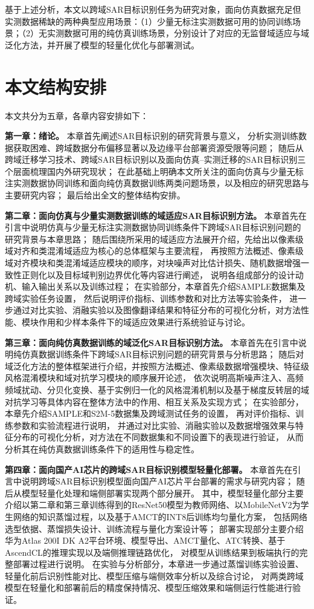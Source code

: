 基于上述分析，本文以跨域SAR目标识别任务为研究对象，面向仿真数据充足但实测数据稀缺的两种典型应用场景：（1）少量无标注实测数据可用的协同训练场景；（2）无实测数据可用的纯仿真训练场景，分别设计了对应的无监督域适应与域泛化方法，并开展了模型的轻量化优化与部署测试。


\section{本文结构安排}

本文共分为五章，各章内容安排如下：

\textbf{第一章：绪论。}
本章首先阐述SAR目标识别的研究背景与意义，
分析实测训练数据获取困难、跨域数据分布偏移显著以及边缘平台部署资源受限等问题；
随后从跨域迁移学习技术、跨域SAR目标识别以及面向仿真--实测迁移的SAR目标识别三个层面梳理国内外研究现状；
在此基础上明确本文所关注的面向仿真与少量无标注实测数据协同训练和面向纯仿真数据训练两类问题场景，以及相应的研究思路与主要研究内容；
最后给出全文的整体结构安排。

\textbf{第二章：面向仿真与少量实测数据训练的域适应SAR目标识别方法。}
本章首先在引言中说明仿真与少量无标注实测数据协同训练条件下跨域SAR目标识别问题的研究背景与本章思路；
随后围绕所采用的域适应方法展开介绍，先给出以像素级域对齐和类混淆域适应为核心的总体框架与主要流程，
再按照方法概述、像素级域对齐模块和类混淆域适应模块的顺序，对块噪声对比估计损失、随机数据增强一致性正则化以及目标域判别边界优化等内容进行阐述，
说明各组成部分的设计动机、输入输出关系以及训练过程；
在实验部分，本章首先介绍SAMPLE数据集及跨域实验任务设置，
然后说明评价指标、训练参数和对比方法等实验条件，
进一步通过对比实验、消融实验以及图像翻译结果和特征分布的可视化分析，对方法性能、模块作用和少样本条件下的域适应效果进行系统验证与讨论。

\textbf{第三章：面向纯仿真数据训练的域泛化SAR目标识别方法。}
本章首先在引言中说明纯仿真数据训练条件下跨域SAR目标识别问题的研究背景与分析思路；
随后对域泛化方法的整体框架进行介绍，并按照方法概述、像素级数据增强模块、特征级风格混淆模块和域对抗学习模块的顺序展开论述，
依次说明高斯噪声注入、高频频域扰动、分贝化变换、基于实例归一化的风格混淆机制以及基于梯度反转层的域对抗学习等具体内容在整体方法中的作用、相互关系及实现方式；
在实验部分，本章先介绍SAMPLE和S2M-5数据集及跨域测试任务的设置，
再对评价指标、训练参数和实验流程进行说明，
并通过对比实验、消融实验以及数据增强效果与特征分布的可视化分析，对方法在不同数据集和不同设置下的表现进行验证，
从而分析其在纯仿真数据训练条件下的适用性与稳定性。

\textbf{第四章：面向国产AI芯片的跨域SAR目标识别模型轻量化部署。}
本章首先在引言中说明跨域SAR目标识别模型面向国产AI芯片平台部署的需求与研究内容；
随后从模型轻量化处理和端侧部署实现两个部分展开。
其中，模型轻量化部分主要介绍以第二章和第三章训练得到的ResNet50模型为教师网络、以MobileNetV2为学生网络的知识蒸馏过程，以及基于AMCT的INT8后训练均匀量化方案，
包括网络选型依据、蒸馏损失设计、训练流程与量化方案设计等；
部署实现部分主要介绍华为Atlas 200I DK A2平台环境、模型导出、AMCT量化、ATC转换、基于AscendCL的推理实现以及端侧推理链路优化，
对模型从训练结果到板端执行的完整部署过程进行说明。
在实验与分析部分，本章进一步通过蒸馏训练实验设置、轻量化前后识别性能对比、模型压缩与端侧效率分析以及综合讨论，
对两类跨域模型在轻量化和部署前后的精度保持情况、模型压缩效果和端侧运行性能进行验证。

